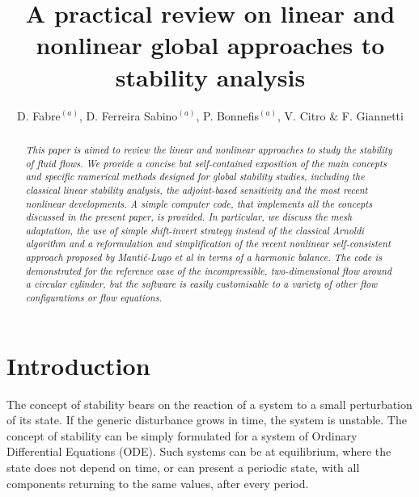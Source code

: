 \documentclass[twocolumn,10pt]{asme2ej}
\title{A {practical} review on linear and nonlinear global approaches to stability analysis}
\author{D. Fabre$^{(a)}$, D. Ferreira Sabino$^{(a)}$, P. Bonnefis$^{(a)}$,  V. Citro \& F. Giannetti
    \affiliation{
	IMFT, University of Toulouse
    }	
}
\begin{document}
\lstset{numbers=left, numberstyle=\small, numbersep=8pt, frame = single, language=Matlab, framexleftmargin=15pt}

\maketitle    

\begin{abstract}
{\it 
This paper is aimed to review the linear and nonlinear approaches to study the stability of fluid flows. 
We provide a concise but self-contained exposition of the main concepts and specific numerical methods 
designed for global stability studies, including the classical linear stability analysis, the adjoint-based sensitivity and  
the most recent nonlinear developments.
A simple computer code, that implements all the concepts discussed in the present paper, is provided. 
In particular, we discuss the mesh adaptation, the use of simple shift-invert strategy instead of the classical Arnoldi algorithm and a reformulation and simplification of the recent nonlinear self-consistent approach proposed by Manti\v{c}-Lugo et al \cite{MLugo2014} in terms of a harmonic balance. The code is demonstrated for the reference case of the incompressible, two-dimensional flow around a circular cylinder, but the software is easily customisable to a variety of other 
flow configurations or flow equations.
}
\end{abstract}



\section{Introduction}

The concept of stability bears on the reaction of a system to a small perturbation of its state. If the generic disturbance grows in time, the system is unstable. The concept of stability can be simply formulated for a system of Ordinary Differential Equations (ODE). 
Such systems can be at equilibrium, where the state does not depend on time, or can present a periodic state, with all components returning to the same values, after every period. 
\end{document}
